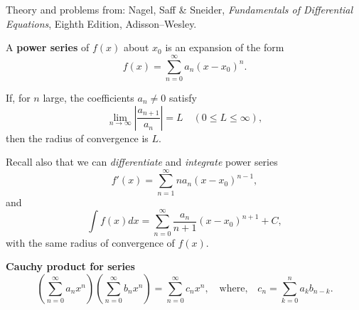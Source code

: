 \documentclass[11pt]{article}
\begin{document}



\LabSolutions




Theory and problems from: Nagel, Saff \& Sneider, \textit{Fundamentals of Differential Equations}, Eighth Edition, Adisson--Wesley.


\begin{preamble}
\begin{formulaitem}
\item A \textbf{power series } of $f(x)$ about $x_{0}$ is an expansion of the form
\[f(x)=\sum_{n=0}^{\infty}a_{n}(x-x_{0})^{n}.\]

\item \begin{theorem}
If, for $n$ large, the coefficients $a_{n}\neq 0$ satisfy
\[\lim_{n\rightarrow \infty}\left|\frac{a_{n+1}}{a_{n}}\right|=L \quad(0\leq L\leq \infty),\]
then the radius of convergence is $L$.
\end{theorem}

\item Recall also that we can \textit{differentiate} and \textit{integrate} power series
\[f'(x)=\sum_{n=1}^{\infty}na_{n}(x-x_{0})^{n-1},\]
and
\[\int f(x) dx=\sum_{n=0}^{\infty}\frac{a_{n}}{n+1}(x-x_{0})^{n+1} + C,\]
with the same radius of convergence of $f(x)$.

\item \textbf{Cauchy product for series}
\begin{equation*}
\left(\sum_{n=0}^{\infty} a_{n} x^n \right)\left(\sum_{n=0}^{\infty} b_{n} x^n \right) =\sum_{n=0}^{\infty} c_{n} x^n, \quad \text{where,} \quad 
c_{n} = \sum_{k=0}^{n} a_{k} b_{n-k}.
\end{equation*}

\end{formulaitem}
\end{preamble}
\end{document}
